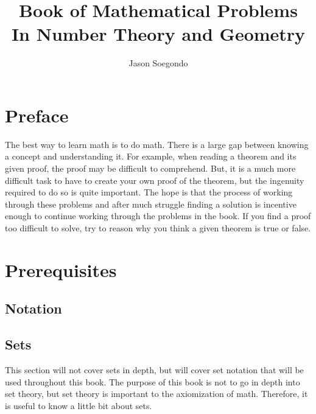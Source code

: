 \documentclass[12pt]{report}
\title{\Huge{\textbf{Book of Mathematical Problems}}\\In Number Theory and Geometry}
\author{\huge{Jason Soegondo}}
\date{}
\begin{document}
\maketitle
\newpage%
\tableofcontents
\pagebreak
\doublespacing

\chapter{Preface}

\hspace{\parindent}The best way to learn math is to do math. There is a large gap between knowing a concept and understanding it. For example, when reading a theorem and its given proof, the proof may be difficult to comprehend. But, it is a much more difficult task to have to create your own proof of the theorem, but the ingenuity required to do so is quite important. The hope is that the process of working through these problems and after much struggle finding a solution is incentive enough to continue working through the problems in the book. If you find a proof too difficult to solve, try to reason why you think a given theorem is true or false.\\

\newpage
\chapter{Prerequisites}

\newpage

\section{Notation}
\section{Sets}
\hspace{\parindent}This section will not cover sets in depth, but will cover set notation that will be used throughout this book. The purpose of this book is not to go in depth into set theory, but set theory is important to the axiomization of math. Therefore, it is useful to know a little bit about sets.
\end{document}
